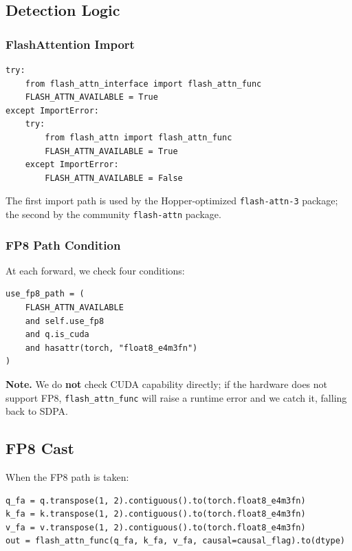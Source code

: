 \subsection{Detection Logic}

\subsubsection{FlashAttention Import}

\begin{lstlisting}
try:
    from flash_attn_interface import flash_attn_func
    FLASH_ATTN_AVAILABLE = True
except ImportError:
    try:
        from flash_attn import flash_attn_func
        FLASH_ATTN_AVAILABLE = True
    except ImportError:
        FLASH_ATTN_AVAILABLE = False
\end{lstlisting}

The first import path is used by the Hopper-optimized \texttt{flash-attn-3} package; 
the second by the community \texttt{flash-attn} package.

\subsubsection{FP8 Path Condition}

At each forward, we check four conditions:

\begin{lstlisting}
use_fp8_path = (
    FLASH_ATTN_AVAILABLE
    and self.use_fp8
    and q.is_cuda
    and hasattr(torch, "float8_e4m3fn")
)
\end{lstlisting}

\textbf{Note.} We do \textbf{not} check CUDA capability directly; if the hardware 
does not support FP8, \texttt{flash\_attn\_func} will raise a runtime error and we 
catch it, falling back to SDPA.

\subsection{FP8 Cast}

When the FP8 path is taken:

\begin{lstlisting}
q_fa = q.transpose(1, 2).contiguous().to(torch.float8_e4m3fn)
k_fa = k.transpose(1, 2).contiguous().to(torch.float8_e4m3fn)
v_fa = v.transpose(1, 2).contiguous().to(torch.float8_e4m3fn)
out = flash_attn_func(q_fa, k_fa, v_fa, causal=causal_flag).to(dtype)
\end{lstlisting}

